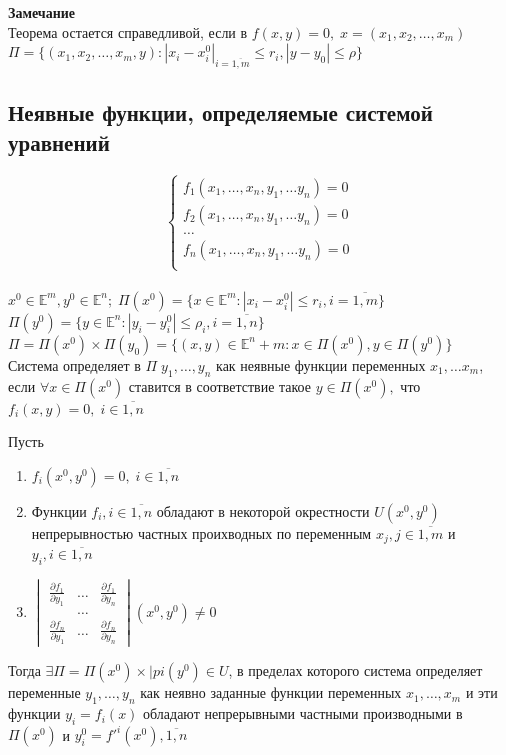 \textbf{Замечание}\\
Теорема остается справедливой, если в $f(x,y)=0, \; x=(x_1,x_2,\dots, x_m)$\\
$\Pi=\{(x_1,x_2,\dots, x_m,y): |x_i-x^0_i|_{i=\overline{1,m}}\leq r_i, |y-y_0|\leq \rho \}$

\subsection{Неявные функции, определяемые системой уравнений}
$$\left\{
\begin{aligned}\label{al:1}
f_1(x_1, \dots, x_n, y_1, \dots y_n )=0\\
f_2(x_1, \dots, x_n, y_1, \dots y_n )=0\\
\dots \\
f_n(x_1, \dots, x_n, y_1, \dots y_n )=0\\
\end{aligned}
\right.
$$\\
$x^0\in\mathbb{E}^m, y^0 \in \mathbb{E}^n; \; 
 \Pi(x^0)=\{x\in \mathbb{E}^m: |x_i-x_i^0|\leq r_i, i=\overline{1,m}\}$ \\
$\Pi(y^0)=\{y\in \mathbb{E}^n: |y_i-y_i^0|\leq \rho_i, i=\overline{1,n}\}$ \\
$\Pi=\Pi(x^0)\times \Pi(y_0)=\{(x,y)\in \mathbb{E}^n+m: x\in\Pi(x^0), y\in \Pi(y^0)\}$\\
Система  определяет в $\Pi\; y_1,\dots,y_n$ как неявные функции переменных $x_1, \dots x_m$, если $\forall x \in \Pi(x^0)$ ставится в соответствие такое $y\in \Pi(x^0),$ что $f_i(x,y)=0, \; i\in\overline{1,n}$ 
\begin{theorem}
	Пусть 
	\begin{enumerate}
		\item $f_i(x^0,y^0)=0, \;i\in\overline{1,n}$
		\item Функции $f_i, i\in\overline{1,n}$ обладают в некоторой окрестности $U(x^0,y^0) $ непрерывностью частных проихводных по переменным $x_j, j\in\overline{1,m}$ и $y_i, i\in\overline{1,n}$ 
		\item 
		$\begin{vmatrix}
			\frac{\partial f_1}{\partial y_1} & \dots & \frac{\partial f_1}{\partial y_n}	 \\
			 & \dots & 	 \\
			\frac{\partial f_n}{\partial y_1}& \dots & \frac{\partial f_n}{\partial y_n}
		\end{vmatrix}(x^0,y^0)\ne 0$
	\end{enumerate}
	Тогда $\exists \Pi=\Pi(x^0)\times |pi(y^0) \in U$, в пределах которого система определяет переменные $y_1,\dots,y_n$ как неявно заданные функции переменных $x_1,\dots,x_m$ и эти функции $y_i=f_i(x)$ обладают непрерывными частными производными в $\Pi(x^0)$ и $y^0_i=f'^i(x^0), \overline{1,n}$
\end{theorem}



